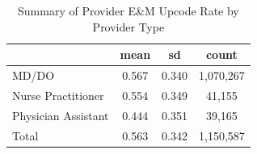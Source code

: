 \begin{table}[htbp]\centering
\def\sym#1{\ifmmode^{#1}\else\(^{#1}\)\fi}
\caption{Summary of Provider E\&M Upcode Rate by Provider Type}
\begin{tabular}{l*{1}{ccc}}
\toprule
                    &        mean&          sd&       count\\
\midrule
MD/DO               &       0.567&       0.340&   1,070,267\\
Nurse Practitioner  &       0.554&       0.349&      41,155\\
Physician Assistant &       0.444&       0.351&      39,165\\
Total               &       0.563&       0.342&   1,150,587\\
\bottomrule
\end{tabular}
\end{table}

